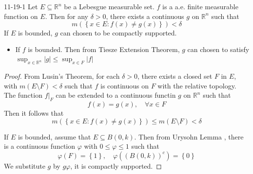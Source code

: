 \documentclass[../main.tex]{subfiles}
\begin{document}
\begin{corollary}{}{11-19-1}
    Let \(  E\subseteq \mathbb{R} ^{n}   \) be a Lebesgue measurable set. \(  f  \) is a a.e. finite measurable function on \(  E  \). Then for any \(   \delta > 0  \), there exists a continuous  \(  g  \) on \(  \mathbb{R} ^{n}   \)   such that \[
    m\left( \left\{ x\in E: f\left( x \right)\neq g\left( x \right)   \right\} \right)<  \delta  
    \] If \(  E  \) is bounded, \(  g  \) can chosen to be compactly supported.   
\end{corollary}

\begin{remark}
    \begin{itemize}
        \item If \(  f  \) is bounded. Then from Tiesze Extension Theorem,  \(  g  \) can chosen to satisfy \(  \sup _{x\in \mathbb{R}^{n}}\left| g \right| \le \sup _{x\in F}\left| f \right|   \)  
    \end{itemize}
    
\end{remark}

\begin{proof}
    From Lusin's Theorem, for each \(   \delta > 0  \), there exists a closed set \(  F  \) in \(  E  \), with \(  m\left( E\setminus  F \right)<  \delta     \) such that \(  f  \) is continuous on \(  F  \) with the relative topology. The function \(  f|_{F}  \) can be extended to a continuous functin    \(  g  \) on \(  \mathbb{R} ^{n}  \) such that \[
    f\left( x \right)= g\left( x \right),\quad \forall x\in F  
    \]  Then it follows that \[
    m\left( \left\{ x\in E:f\left( x \right)\neq g\left( x \right)   \right\} \right)\le m\left( E\setminus F \right)<  \delta   
    \]

    If \(  E  \) is bounded, assume that \(  E\subseteq B\left( 0,k \right)   \). Then from Urysohn Lemma , there is a continuous function \(   \varphi   \) with \(  0\le  \varphi \le 1  \)   such that \[
     \varphi \left(F  \right)= \left\{ 1 \right\},  \quad \varphi \left( \left(B\left( 0,k \right)  \right)^{c}  \right)= \left\{ 0 \right\}  
    \] We substitute \(  g  \) by \(  g   \varphi   \), it is compactly supported.
\end{proof}
\end{document}
